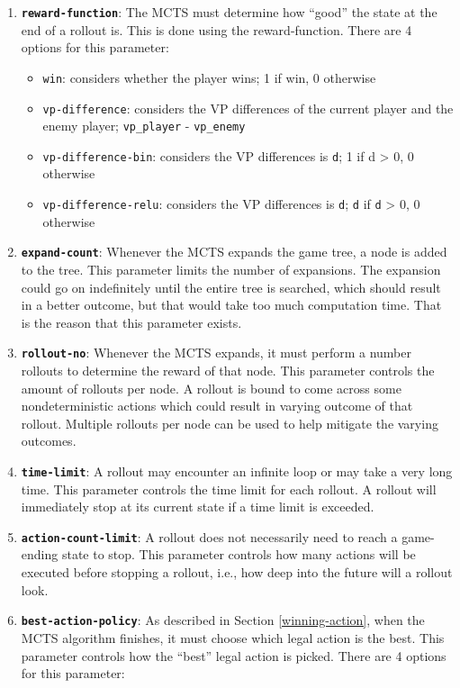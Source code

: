 \begin{enumerate}
  \item \textbf{\texttt{reward-function}}: The MCTS must determine how ``good'' the state at the end of a rollout is. This is done using the reward-function. There are 4 options for this parameter:
  \begin{itemize}
    \item \texttt{win}: considers whether the player wins; 1 if win, 0 otherwise
    \item \texttt{vp-difference}: considers the VP differences of the current player and the enemy player; \texttt{vp\_player} - \texttt{vp\_enemy}
    \item \texttt{vp-difference-bin}: considers the VP differences is \texttt{d}; 1 if d > 0,  0 otherwise
    \item \texttt{vp-difference-relu}: considers the VP differences is \texttt{d}; \texttt{d} if \texttt{d} > 0, 0 otherwise  
  \end{itemize}
  \item \textbf{\texttt{expand-count}}: Whenever the MCTS expands the game tree, a node is added to the tree. This parameter limits the number of expansions. The expansion could go on indefinitely until the entire tree is searched, which should result in a better outcome, but that would take too much computation time. That is the reason that this parameter exists.
  \item \textbf{\texttt{rollout-no}}: Whenever the MCTS expands, it must perform a number rollouts to determine the reward of that node. This parameter controls the amount of rollouts per node. A rollout is bound to come across some nondeterministic actions which could result in varying outcome of that rollout. Multiple rollouts per node can be used to help mitigate the varying outcomes.
  \item \textbf{\texttt{time-limit}}: A rollout may encounter an infinite loop or may take a very long time. This parameter controls the time limit for each rollout. A rollout will immediately stop at its current state if a time limit is exceeded. %
  \item \textbf{\texttt{action-count-limit}}: A rollout does not necessarily need to reach a game-ending state to stop. This parameter controls how many actions will be executed before stopping a rollout, i.e., how deep into the future will a rollout look.
  \item \textbf{\texttt{best-action-policy}}: As described in Section \ref{winning-action}, when the MCTS algorithm finishes, it must choose which legal action is the best. This parameter controls how the ``best'' legal action is picked. There are 4 options for this parameter:

\end{enumerate}
